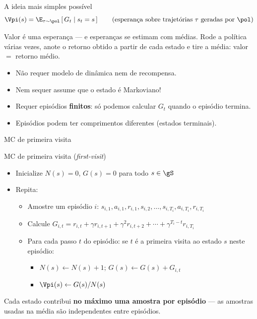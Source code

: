 \documentclass[aspectratio=169, 11pt]{beamer}
\begin{document}
\begin{frame}{A ideia mais simples possível}
  \[
    \Vpi(s) = \E_{\tau \sim \pol}\left[\, G_t \mid s_t = s \,\right]
    \qquad \text{(esperança sobre trajetórias $\tau$ geradas por $\pol$)}
  \]

  \begin{ideiabox}
    Valor é uma esperança — e esperanças se estimam com médias.
    Rode a política várias vezes, anote o retorno obtido a partir de cada
    estado e tire a média: \alert{valor $=$ retorno médio}.
  \end{ideiabox}

  \begin{itemize}
    \item Não requer modelo de dinâmica nem de recompensa.
    \item Nem sequer assume que o estado é Markoviano!
    \item Requer episódios \textbf{finitos}: só podemos calcular $G_t$
      quando o episódio termina.
    \item Episódios podem ter comprimentos diferentes (estados terminais).
  \end{itemize}
\end{frame}

\begin{frame}{MC de primeira visita}
  \begin{algbox}{MC de primeira visita (\emph{first-visit})}
    \begin{itemize}\setlength{\itemsep}{0.2ex}
      \item Inicialize $N(s) = 0$, $G(s) = 0$ para todo $s \in \gS$
      \item Repita:
      \begin{itemize}\setlength{\itemsep}{0.15ex}
        \item Amostre um episódio $i$: $s_{i,1}, a_{i,1}, r_{i,1}, s_{i,2}, \ldots, s_{i,T_i}, a_{i,T_i}, r_{i,T_i}$
        \item Calcule $G_{i,t} = r_{i,t} + \gamma r_{i,t+1} + \gamma^2 r_{i,t+2} + \cdots + \gamma^{T_i - t} r_{i,T_i}$
        \item Para cada passo $t$ do episódio:
          se $t$ é a \alert{primeira} visita ao estado $s$ neste episódio:
          \begin{itemize}
            \item $N(s) \leftarrow N(s) + 1$; \quad $G(s) \leftarrow G(s) + G_{i,t}$
            \item $\Vpi(s) \leftarrow G(s)/N(s)$
          \end{itemize}
      \end{itemize}
    \end{itemize}
  \end{algbox}

  Cada estado contribui \textbf{no máximo uma amostra por episódio} —
  as amostras usadas na média são independentes entre episódios.
\end{frame}
\end{document}
